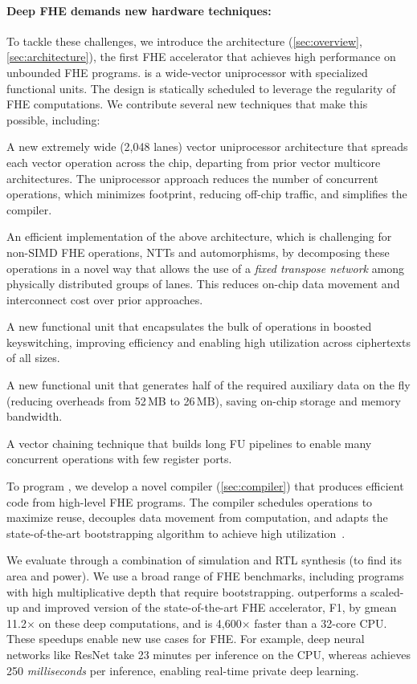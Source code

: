 \paragraph{Deep FHE demands new hardware techniques:}
To tackle these challenges, we introduce the \emph{\name} architecture
(\autoref{sec:overview}, \autoref{sec:architecture}), the first FHE accelerator
that achieves high performance on unbounded FHE programs. \name is a
wide-vector uniprocessor with specialized functional units. The design is
statically scheduled to leverage the regularity of FHE computations. We
contribute several new techniques that make this possible, including:
\begin{compactitem}
\item A new extremely wide (2,048 lanes) vector uniprocessor architecture that
    spreads each vector operation across the chip, departing from prior vector
    multicore architectures. The uniprocessor approach reduces the number of
    concurrent operations, which minimizes footprint, reducing off-chip
    traffic, and simplifies the compiler.
\item An efficient implementation of the above architecture, which is
    challenging for non-SIMD FHE operations, NTTs and automorphisms, by
    decomposing these operations in a novel way that allows the use of a
    \emph{fixed transpose network} among physically distributed groups of
    lanes. This reduces on-chip data movement and interconnect cost over prior
    approaches.
\item A new functional unit that encapsulates the bulk of operations in boosted
    keyswitching, improving efficiency and enabling high utilization across
    ciphertexts of all sizes.
\item A new functional unit that generates half of the required auxiliary data
    on the fly (reducing overheads from 52\,MB to 26\,MB), saving on-chip
    storage and memory bandwidth.
\item A vector chaining technique that builds long FU pipelines to enable many
    concurrent operations with few register ports.
\end{compactitem}
To program \name, we develop a novel compiler (\autoref{sec:compiler}) that
produces efficient code from high-level FHE programs. The compiler schedules
operations to maximize reuse, decouples data movement from computation, and
adapts the state-of-the-art bootstrapping algorithm to achieve high
utilization~\cite{bossuat:crypto21:efficient}.


We evaluate \name through a combination of simulation and RTL synthesis (to
find its area and power). We use a broad range of FHE benchmarks, including
programs with high multiplicative depth that require bootstrapping. \name
outperforms a scaled-up and improved version of the state-of-the-art FHE
accelerator, F1, by gmean 11.2$\times$ on these deep computations, and is
4,600$\times$ faster than a 32-core CPU. These speedups enable new use cases
for FHE. For example, deep neural networks like ResNet take 23 minutes per
inference on the CPU, whereas \name achieves 250 \emph{milliseconds} per
inference, enabling real-time private deep learning.
